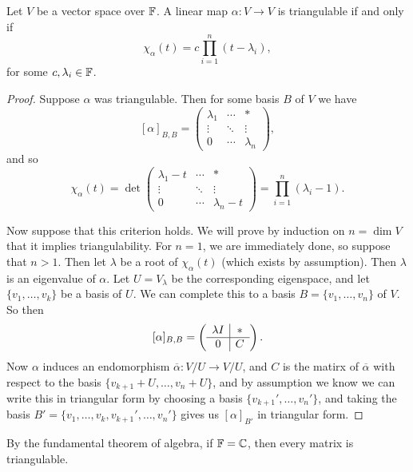 \documentclass[a4paper]{scrartcl}
\begin{document}
\begin{theorem}
    Let $V$ be a vector space over $\mathbb{F}$.
    A linear map $\alpha: V \rightarrow V$ is triangulable if and only if
    $$
    \chi_{\alpha}(t) = c \prod_{i = 1}^n (t - \lambda_i),
    $$
    for some $c, \lambda_i\in \mathbb{F}$.
\end{theorem}
\begin{proof}
    Suppose $\alpha$ was triangulable. Then for some basis $B$ of $V$ we have
    $$
    [\alpha]_{B, B} = \begin{pmatrix}
        \lambda_1 & \cdots & * \\
        \vdots & \ddots & \vdots \\
        0 & \cdots & \lambda_n
    \end{pmatrix}, 
    $$
    and so
    $$
    \chi_{\alpha}(t) = \det  \begin{pmatrix}
        \lambda_1 - t & \cdots & * \\
        \vdots & \ddots & \vdots \\
        0 & \cdots & \lambda_n - t
    \end{pmatrix} = \prod_{i = 1}^n(\lambda_i - 1).
    $$

    Now suppose that this criterion holds. We will prove by induction on $n = \dim V$ that it implies triangulability. For $n = 1$, we are immediately done, so suppose that $n > 1$. Then let $\lambda$ be a root of $\chi_{\alpha}(t)$ (which exists by assumption). Then $\lambda$ is an eigenvalue of $\alpha$. Let $U = V_\lambda$ be the corresponding eigenspace, and let $\{v_1, \dots, v_k\}$ be a basis of $U$. We can complete this to a basis $B = \{v_1, \dots, v_n\}$ of $V$. So then
    $$
    [\alpha]_{B, B} = \left(\begin{array}{ c | c }
                \lambda I & *\\
                \hline
                0 & C
              \end{array}\right).
    $$
    Now $\alpha$ induces an endomorphism $\overline{\alpha} : V / U \rightarrow V / U$, and $C$ is the matirx of $\overline{\alpha}$ with respect to the basis $\{v_{k + 1} + U, \dots, v_n + U\}$, and by assumption we know we can write this in triangular form by choosing a basis $\{v_{k + 1}', \dots, v_n'\}$, and taking the basis $B' = \{v_1, \dots, v_k, v_{k + 1}', \dots, v_n'\}$ gives us $[\alpha]_{B'}$ in triangular form.
\end{proof}
\begin{remark}
    By the fundamental theorem of algebra, if $\mathbb{F} = \mathbb{C}$, then every matrix is triangulable.
\end{remark}
\end{document}
